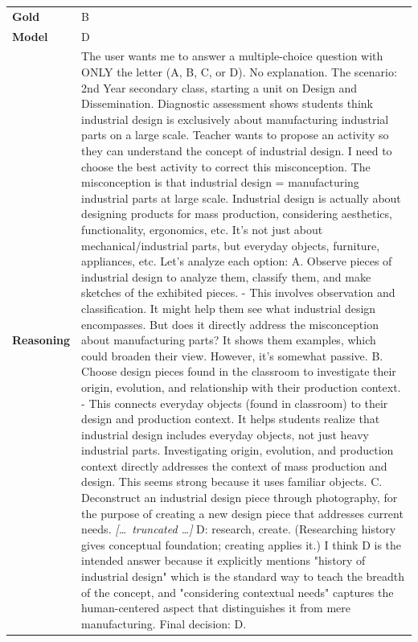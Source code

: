 \begin{longtable}{@{}l p{13cm}@{}}
  \textbf{Gold}      & B       \\
  \textbf{Model}     & D  \\
  \textbf{Reasoning} & The user wants me to answer a multiple-choice question with ONLY the letter (A, B, C, or D). No explanation. \newline The scenario: 2nd Year secondary class, starting a unit on Design and Dissemination. Diagnostic assessment shows students think industrial design is exclusively about manufacturing industrial parts on a large scale. Teacher wants to propose an activity so they can understand the concept of industrial design. \newline I need to choose the best activity to correct this misconception. The misconception is that industrial design = manufacturing industrial parts at large scale. Industrial design is actually about designing products for mass production, considering aesthetics, functionality, ergonomics, etc. It's not just about mechanical/industrial parts, but everyday objects, furniture, appliances, etc. \newline Let's analyze each option: \newline A. Observe pieces of industrial design to analyze them, classify them, and make sketches of the exhibited pieces. \newline - This involves observation and classification. It might help them see what industrial design encompasses. But does it directly address the misconception about manufacturing parts? It shows them examples, which could broaden their view. However, it's somewhat passive. \newline B. Choose design pieces found in the classroom to investigate their origin, evolution, and relationship with their production context. \newline - This connects everyday objects (found in classroom) to their design and production context. It helps students realize that industrial design includes everyday objects, not just heavy industrial parts. Investigating origin, evolution, and production context directly addresses the context of mass production and design. This seems strong because it uses familiar objects. \newline C. Deconstruct an industrial design piece through photography, for the purpose of creating a new design piece that addresses current needs. \newline \textit{[\ldots\ truncated \ldots]} \newline D: research, create. (Researching history gives conceptual foundation; creating applies it.) \newline I think D is the intended answer because it explicitly mentions "history of industrial design" which is the standard way to teach the breadth of the concept, and "considering contextual needs" captures the human-centered aspect that distinguishes it from mere manufacturing. \newline Final decision: D.  \\

\end{longtable}
